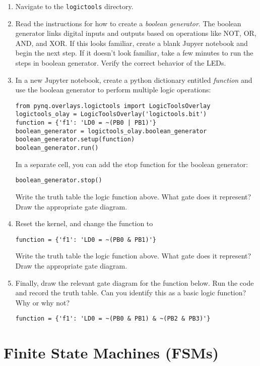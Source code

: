\documentclass{article}
\begin{document}
\begin{enumerate}
\item Navigate to the \verb+logictools+ directory.
\item Read the instructions for how to create a \textit{boolean generator}.  The boolean generator links digital inputs and outputs based on operations like NOT, OR, AND, and XOR.  If this looks familiar, create a blank Jupyer notebook and begin the next step.  If it doesn't look familiar, take a few minutes to run the steps in boolean generator.  Verify the correct behavior of the LEDs.
\item In a new Jupyter notebook, create a python dictionary entitled \textit{function} and use the boolean generator to perform multiple logic operations:
\begin{verbatim}
from pynq.overlays.logictools import LogicToolsOverlay
logictools_olay = LogicToolsOverlay('logictools.bit')
function = {'f1': 'LD0 = ~(PB0 | PB1)'}
boolean_generator = logictools_olay.boolean_generator
boolean_generator.setup(function)
boolean_generator.run()
\end{verbatim}
In a separate cell, you can add the stop function for the boolean generator:
\begin{verbatim}
boolean_generator.stop()
\end{verbatim}
Write the truth table the logic function above.  What gate does it represent?  Draw the appropriate gate diagram.  \\ \vspace{0.5cm}
\item Reset the kernel, and change the function to 
\begin{verbatim}
function = {'f1': 'LD0 = ~(PB0 & PB1)'}
\end{verbatim}
Write the truth table the logic function above.  What gate does it represent?  Draw the appropriate gate diagram.  \\ \vspace{0.5cm}
\item Finally, draw the relevant gate diagram for the function below.  Run the code and record the truth table.  Can you identify this as a basic logic function?  Why or why not?  
\begin{verbatim}
function = {'f1': 'LD0 = ~(PB0 & PB1) & ~(PB2 & PB3)'}
\end{verbatim}
\end{enumerate}

\section{Finite State Machines (FSMs)}
\end{document}
